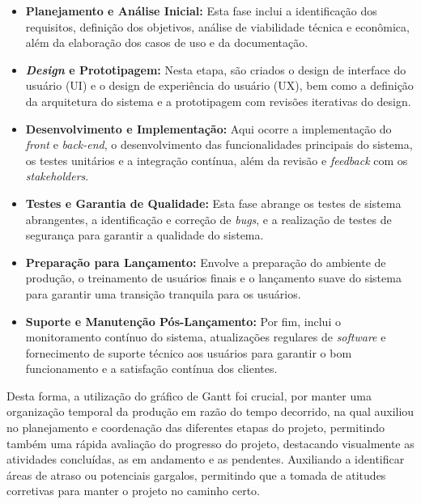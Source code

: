 \begin{itemize}
    \item \textbf{Planejamento e Análise Inicial:} Esta fase inclui a identificação dos requisitos, definição dos objetivos, análise de viabilidade técnica e econômica, além da elaboração dos casos de uso e da documentação.
    
    \item \textbf{\textit{Design} e Prototipagem:} Nesta etapa, são criados o design de interface do usuário (UI) e o design de experiência do usuário (UX), bem como a definição da arquitetura do sistema e a prototipagem com revisões iterativas do design.
    
    \item \textbf{Desenvolvimento e Implementação:} Aqui ocorre a implementação do \textit{front} e \textit{back-end}, o desenvolvimento das funcionalidades principais do sistema, os testes unitários e a integração contínua, além da revisão e \textit{feedback} com os \textit{stakeholders}.
    
    \item \textbf{Testes e Garantia de Qualidade:} Esta fase abrange os testes de sistema abrangentes, a identificação e correção de \textit{bugs}, e a realização de testes de segurança para garantir a qualidade do sistema.
    
    \item \textbf{Preparação para Lançamento:} Envolve a preparação do ambiente de produção, o treinamento de usuários finais e o lançamento suave do sistema para garantir uma transição tranquila para os usuários.
    
    \item \textbf{Suporte e Manutenção Pós-Lançamento:} Por fim, inclui o monitoramento contínuo do sistema, atualizações regulares de \textit{software} e fornecimento de suporte técnico aos usuários para garantir o bom funcionamento e a satisfação contínua dos clientes.
\end{itemize}

Desta forma, a utilização do gráfico de Gantt foi crucial, por manter uma organização temporal da produção em razão do tempo decorrido, na qual auxiliou no planejamento e coordenação das diferentes etapas do projeto, permitindo também uma rápida avaliação do progresso do projeto, destacando visualmente as atividades concluídas, as em andamento e as pendentes. Auxiliando a identificar áreas de atraso ou potenciais gargalos, permitindo que a tomada de atitudes corretivas para manter o projeto no caminho certo.
        
